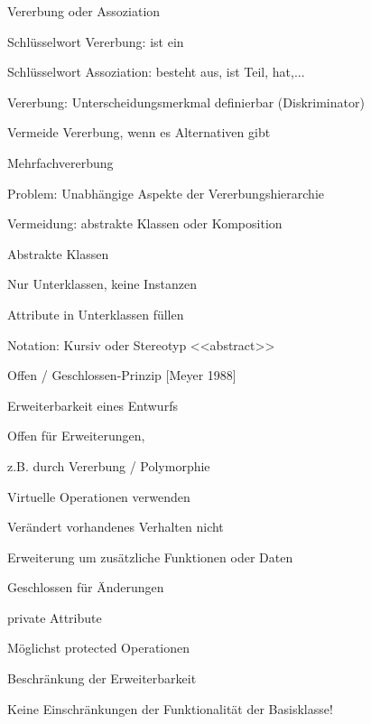 \documentclass[a4paper]{article}
\begin{document}
\begin{multicols}{3}
  Vererbung oder Assoziation
  \begin{itemize*}
    \item Schlüsselwort Vererbung: ist ein
    \item Schlüsselwort Assoziation: besteht aus, ist Teil, hat,...
    \item Vererbung: Unterscheidungsmerkmal definierbar (Diskriminator)
    \item Vermeide Vererbung, wenn es Alternativen gibt
    \item Mehrfachvererbung
          \begin{itemize*}
            \item Problem: Unabhängige Aspekte der Vererbungshierarchie
            \item Vermeidung: abstrakte Klassen oder Komposition
          \end{itemize*}
  \end{itemize*}

  Abstrakte Klassen
  \begin{itemize*}
    \item Nur Unterklassen, keine Instanzen
    \item Attribute in Unterklassen füllen
    \item Notation: Kursiv oder Stereotyp <<abstract>>
  \end{itemize*}

  Offen / Geschlossen-Prinzip [Meyer 1988]
  \begin{itemize*}
    \item Erweiterbarkeit eines Entwurfs
    \item Offen für Erweiterungen,
          \begin{itemize*}
            \item z.B. durch Vererbung / Polymorphie
            \item Virtuelle Operationen verwenden
            \item Verändert vorhandenes Verhalten nicht
            \item Erweiterung um zusätzliche Funktionen oder Daten
          \end{itemize*}
    \item Geschlossen für Änderungen
          \begin{itemize*}
            \item private Attribute
            \item Möglichst protected Operationen
          \end{itemize*}
    \item Beschränkung der Erweiterbarkeit
          \begin{itemize*}
            \item Keine Einschränkungen der Funktionalität der Basisklasse!
          \end{itemize*}
  \end{itemize*}


\end{multicols}
\end{document}
